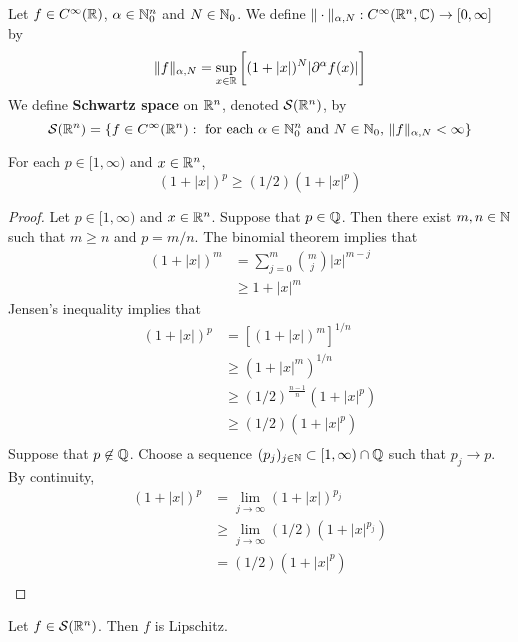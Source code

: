 \documentclass{book}
\begin{document}
	\begin{defn} 
		 Let $f \in C^{\infty}(\mathbb{R})$, $\alpha \in \mathbb{N}_0^n$ and $N \in \mathbb{N}_0$. We define $\| \cdot \|_{\alpha, N}: C^{\infty}(\mathbb{R}^n, \mathbb{C}) \rightarrow [0,\infty]$ by 
		$$\|f\|_{\alpha, N} = \sup_{x \in \mathbb{R}} \bigg[  (1 + |x|)^N |\partial^{\alpha}f (x)| \bigg] $$
		We define \textbf{Schwartz space} on $\mathbb{R}^n$, denoted $\mathcal{S}(\mathbb{R}^n)$, by $$\mathcal{S}(\mathbb{R}^n) = \{f \in C^{\infty}(\mathbb{R}^n): \text{ for each $\alpha \in \mathbb{N}_0^n$ and $N \in  \mathbb{N}_0$, } \|f\|_{\alpha, N} < \infty\}$$
	\end{defn}

	\begin{ex} 
		For each $p \in [1, \infty)$ and $x \in \mathbb{R}^n$, 
		$$(1 + |x|)^p \geq (1/2) (1 + |x|^p)$$
	\end{ex}
	
	\begin{proof}
		Let $p \in [1, \infty)$ and $x \in \mathbb{R}^n$. Suppose that $p \in \mathbb{Q}$. Then there exist $m,n \in \mathbb{N}$ such that $m \geq n$ and $p = m/n$. The binomial theorem implies that 
		\begin{align*}
			(1 + |x|)^m
			& = \sum_{j=0}^{m} {m \choose j}|x|^{m-j} \\
			& \geq 1 + |x|^m
		\end{align*} 
		Jensen's inequality implies that 
		\begin{align*}
			(1 + |x|)^p
			& = [(1 + |x|)^m]^{1/n} \\
			& \geq (1 + |x|^m)^{1/n} \\
			& \geq (1/2)^{\frac{n-1}{n}} (1 + |x|^p) \\
			& \geq (1/2) (1 + |x|^p) \\
		\end{align*}
		Suppose that $p \not \in \mathbb{Q}$. Choose a sequence $(p_j)_{j \in \mathbb{N}} \subset [1, \infty) \cap \mathbb{Q}$ such that $p_j \rightarrow p$. By continuity, 
		\begin{align*}
			(1 + |x|)^p
			& = \lim_{j \rightarrow \infty} (1 + |x|)^{p_j} \\
			& \geq \lim_{j \rightarrow \infty} (1/2) (1 + |x|^{p_j}) \\
			& = (1/2) (1 + |x|^p) \\
		\end{align*}
	\end{proof}

	\begin{ex} 
		 Let $f \in \mathcal{S}(\mathbb{R}^n)$. Then $f$ is Lipschitz.
	\end{ex}
	
\end{document}
